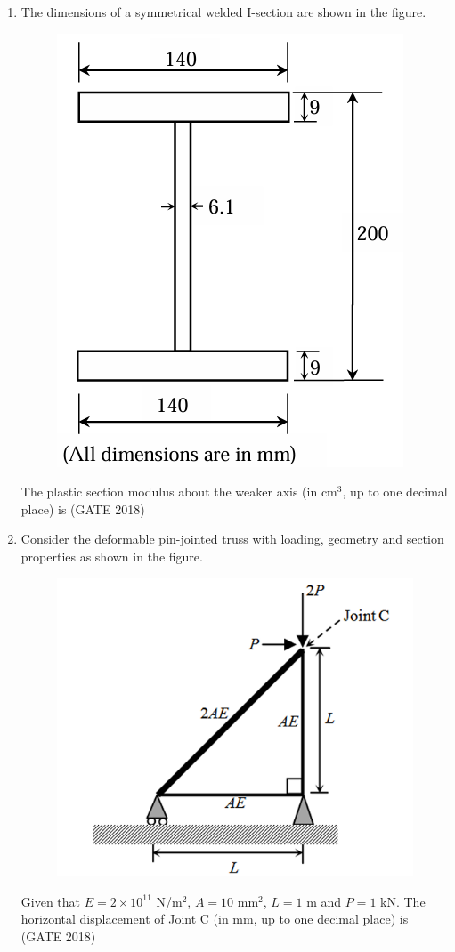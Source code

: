 \documentclass[journal,12pt,onecolumn]{IEEEtran}
\theoremstyle{remark}
\begin{document}
\begin{enumerate}
\item The dimensions of a symmetrical welded I-section are shown in the figure.
\begin{figure}[h]
    \centering
    \includegraphics[width=0.5\linewidth]{GATE-CE-2018/42-1.png}
    \caption{}
    \label{42-1}
\end{figure}
The plastic section modulus about the weaker axis (in cm$^3$, up to one decimal place) is \underline{\hspace{3cm}}
\hfill{(GATE 2018)}
\vspace{1cm}
\newpage
\item Consider the deformable pin-jointed truss with loading, geometry and section properties as shown in the figure.
\begin{figure}[h]
    \centering
    \includegraphics[width=0.5\linewidth]{GATE-CE-2018/43-1.png}
    \caption{}
    \label{43-1}
\end{figure}
Given that $E = 2 \times 10^{11}$ N/m$^2$, $A = 10$ mm$^2$, $L = 1$ m and $P = 1$ kN. The horizontal displacement of Joint C (in mm, up to one decimal place) is \underline{\hspace{3cm}}
\hfill{(GATE 2018)}
\vspace{1cm}


\end{enumerate}
\end{document}
